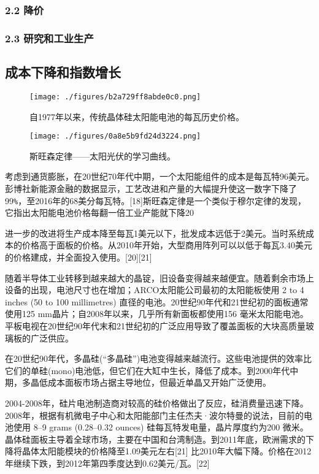 \subsubsection{2.2 降价}



\subsubsection{2.3 研究和工业生产}



\subsection{成本下降和指数增长}

\begin{figure}[ht]
\centering
\texttt{[image: ./figures/b2a729ff8abde0c0.png]}
\caption{自1977年以来，传统晶体硅太阳能电池的每瓦历史价格。} \label{fig_TYNDC_12}
\end{figure}

\begin{figure}[ht]
\centering
\texttt{[image: ./figures/0a8e5b9fd24d3224.png]}
\caption{斯旺森定律——太阳光伏的学习曲线。} \label{fig_TYNDC_13}
\end{figure}

考虑到通货膨胀，在20世纪70年代中期，一个太阳能组件的成本是每瓦特96美元。彭博社新能源金融的数据显示，工艺改进和产量的大幅提升使这一数字下降了99\verb|%|，至2016年的68美分每瓦特。[18]斯旺森定律是一个类似于穆尔定律的发现，它指出太阳能电池价格每翻一倍工业产能就下降20%

进一步的改进将生产成本降至每瓦1美元以下，批发成本远低于2美元。当时系统成本的价格高于面板的价格。从2010年开始，大型商用阵列可以以低于每瓦3.40美元的价格建成，并全面投入使用。[20][21]

随着半导体工业转移到越来越大的晶锭，旧设备变得越来越便宜。随着剩余市场上设备的出现，电池尺寸也在增加；ARCO太阳能公司最初的太阳能板使用 2 to 4 inches (50 to 100 millimetres) 直径的电池。20世纪90年代和21世纪初的面板通常使用125 mm晶片；自2008年以来，几乎所有新面板都使用156 毫米太阳能电池。平板电视在20世纪90年代末和21世纪初的广泛应用导致了覆盖面板的大块高质量玻璃板的广泛供应。

在20世纪90年代，多晶硅(“多晶硅”)电池变得越来越流行。这些电池提供的效率比它们的单硅(mono)电池低，但它们在大缸中生长，降低了成本。到2000年代中期，多晶低成本面板市场占据主导地位，但最近单晶又开始广泛使用。

2004-2008年，硅片电池制造商对较高的硅价格做出了反应，硅消费量迅速下降。2008年，根据有机微电子中心和太阳能部门主任杰夫·波尔特曼的说法，目前的电池使用 8–9 grams (0.28–0.32 ounces) 硅每瓦特发电量，晶片厚度约为200 微米。 晶体硅面板主导着全球市场，主要在中国和台湾制造。到2011年底，欧洲需求的下降将晶体太阳能模块的价格降至1.09美元左右[21] 比2010年大幅下降。价格在2012年继续下跌，到2012年第四季度达到0.62美元/瓦。[22]

